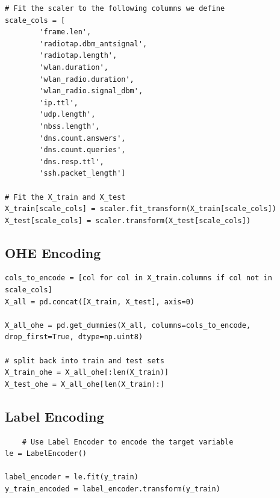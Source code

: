 \begin{appendices}
\begin{lstlisting}
# Fit the scaler to the following columns we define
scale_cols = [
        'frame.len',
        'radiotap.dbm_antsignal', 
        'radiotap.length', 
        'wlan.duration', 
        'wlan_radio.duration', 
        'wlan_radio.signal_dbm',
        'ip.ttl', 
        'udp.length', 
        'nbss.length',
        'dns.count.answers', 
        'dns.count.queries',
        'dns.resp.ttl',
        'ssh.packet_length']
        
# Fit the X_train and X_test
X_train[scale_cols] = scaler.fit_transform(X_train[scale_cols])
X_test[scale_cols] = scaler.transform(X_test[scale_cols])
\end{lstlisting}

\subsection{OHE Encoding}
\label{appx:OHE Encoding}
\begin{lstlisting}
cols_to_encode = [col for col in X_train.columns if col not in scale_cols]
X_all = pd.concat([X_train, X_test], axis=0)

X_all_ohe = pd.get_dummies(X_all, columns=cols_to_encode, drop_first=True, dtype=np.uint8)

# split back into train and test sets
X_train_ohe = X_all_ohe[:len(X_train)]
X_test_ohe = X_all_ohe[len(X_train):]
\end{lstlisting}

\newpage
\subsection{Label Encoding}
\label{appx:Label Encoding}
\begin{lstlisting}
    # Use Label Encoder to encode the target variable
le = LabelEncoder()

label_encoder = le.fit(y_train)
y_train_encoded = label_encoder.transform(y_train)
\end{lstlisting}


\end{appendices}

